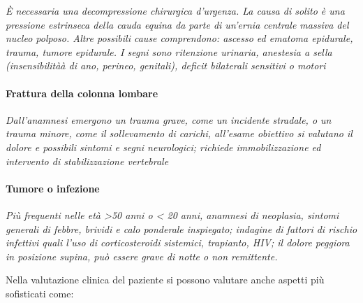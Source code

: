 \emph{È necessaria una decompressione chirurgica d'urgenza. La causa di
solito è una pressione estrinseca della cauda equina da parte di
un'ernia centrale massiva del nucleo polposo. Altre possibili cause
comprendono: ascesso ed ematoma epidurale, trauma, tumore epidurale. I
segni sono ritenzione urinaria, anestesia a sella (insensibilitàà di
ano, perineo, genitali), deficit bilaterali sensitivi o motori }

\paragraph{Frattura della colonna lombare}


\emph{Dall'anamnesi emergono un trauma grave, come un incidente
stradale, o un trauma minore, come il sollevamento di carichi, all'esame
obiettivo si valutano il dolore e possibili sintomi e segni neurologici;
richiede immobilizzazione ed intervento di stabilizzazione vertebrale }

\paragraph{Tumore o infezione}


\emph{Più frequenti nelle età \textgreater{}50 anni o \textless{} 20
anni, anamnesi di neoplasia, sintomi generali di febbre, brividi e calo
ponderale inspiegato; indagine di fattori di rischio infettivi quali
l'uso di corticosteroidi sistemici, trapianto, HIV; il dolore peggiora
in posizione supina, può essere grave di notte o non remittente. }

Nella valutazione clinica del paziente si possono valutare anche aspetti
più sofisticati come:

